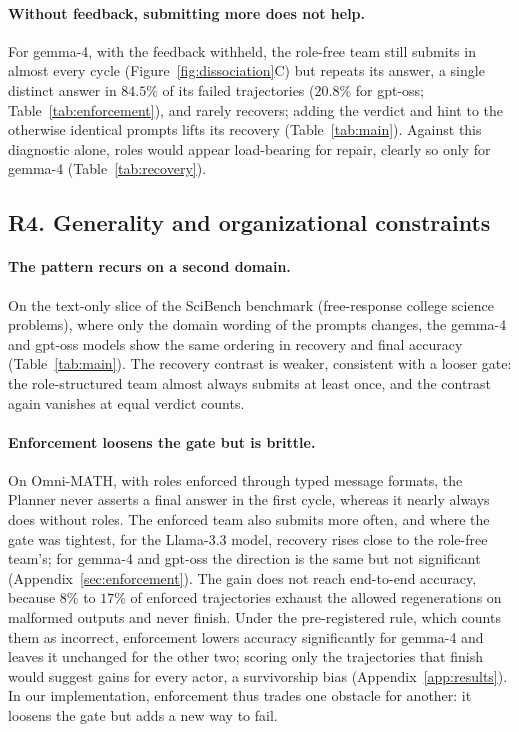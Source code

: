 \paragraph{Without feedback, submitting more does not help.} For gemma-4, with the feedback withheld, the role-free team still
submits in almost every cycle
(Figure~\ref{fig:dissociation}C) but repeats its answer, a single distinct answer in $84.5\%$ of its failed trajectories
($20.8\%$ for gpt-oss; Table~\ref{tab:enforcement}), and rarely recovers;
adding the verdict and hint to the otherwise identical prompts lifts its
recovery (Table~\ref{tab:main}). Against this diagnostic alone, roles would appear load-bearing for repair, clearly so only for gemma-4
(Table~\ref{tab:recovery}).

\subsection{R4. Generality and organizational constraints}
\label{subsec:xdomain}

\paragraph{The pattern recurs on a second domain.} On the text-only slice
of the SciBench benchmark (free-response college science problems), where only the domain wording of the prompts changes,
the gemma-4 and gpt-oss models show the same ordering in recovery and final
accuracy (Table~\ref{tab:main}). The recovery contrast is weaker,
consistent with a looser gate: the role-structured team almost always
submits at least once, and the contrast again vanishes at equal verdict
counts.

\paragraph{Enforcement loosens the gate but is brittle.}
\label{subsec:enforce} On Omni-MATH, with roles enforced through typed message formats, the
Planner never asserts a final answer in the first cycle, whereas it nearly
always does without roles. The enforced team also submits more often,
and where the gate was tightest, for the Llama-3.3 model, recovery rises
close to the role-free team's; for gemma-4 and gpt-oss the direction is the
same but not significant (Appendix~\ref{sec:enforcement}). The gain does not
reach end-to-end accuracy, because $8\%$ to $17\%$ of enforced trajectories
exhaust the allowed regenerations on malformed outputs and never finish.
Under the pre-registered rule, which counts them as incorrect, enforcement
lowers accuracy significantly for gemma-4 and leaves it unchanged for the other two; scoring only the trajectories that finish would suggest
gains for every actor, a survivorship bias (Appendix~\ref{app:results}). In
our implementation, enforcement thus trades one obstacle for another: it loosens the gate but adds a new way to fail.
